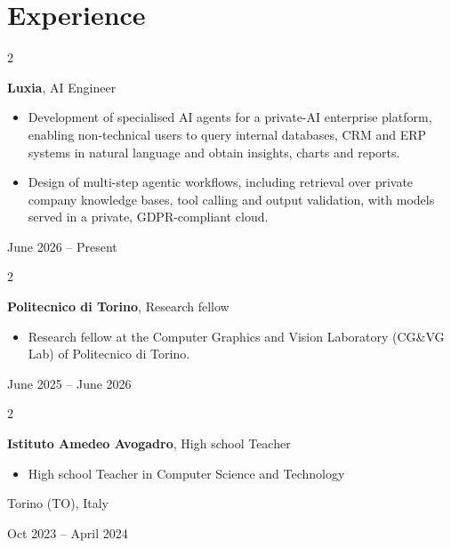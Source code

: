 \documentclass[10pt, letterpaper]{article}
\newenvironment{highlights}{
    \begin{itemize}[
        topsep=0.10 cm,
        parsep=0.10 cm,
        partopsep=0pt,
        itemsep=0pt,
        leftmargin=0.4 cm + 10pt
    ]
}{
    \end{itemize}
} %
\newenvironment{twocolentry}[2][]{
    \onecolentry
    \def\secondColumn{#2}
    \setcolumnwidth{\fill, 4.5 cm}
    \begin{paracol}{2}
}{
    \switchcolumn \raggedleft \secondColumn
    \end{paracol}
    \endonecolentry
} %
\begin{document}
       \section{Experience}

   \begin{twocolentry}{

        June 2026 – Present
        }
            \textbf{Luxia}, AI Engineer
             \begin{highlights}
                \item Development of specialised AI agents for a private-AI enterprise platform, enabling non-technical users to query internal databases, CRM and ERP systems in natural language and obtain insights, charts and reports.
                \item Design of multi-step agentic workflows, including retrieval over private company knowledge bases, tool calling and output validation, with models served in a private, GDPR-compliant cloud.
            \end{highlights}
         \end{twocolentry}

\vspace{0.2 cm}

   \begin{twocolentry}{

        June 2025 – June 2026
        }
            \textbf{Politecnico di Torino}, Research fellow
            \begin{highlights}
                \item Research fellow at the Computer Graphics and Vision Laboratory (CG\&VG Lab) of Politecnico di Torino.
            \end{highlights}
         \end{twocolentry}

\vspace{0.2 cm}

         \begin{twocolentry}{
            Torino (TO), Italy

         Oct 2023 – April 2024
         }
            \textbf{Istituto Amedeo Avogadro}, High school Teacher
            \begin{highlights}
                \item High school Teacher in Computer Science and Technology
            \end{highlights}
         \end{twocolentry}
        
\end{document}
